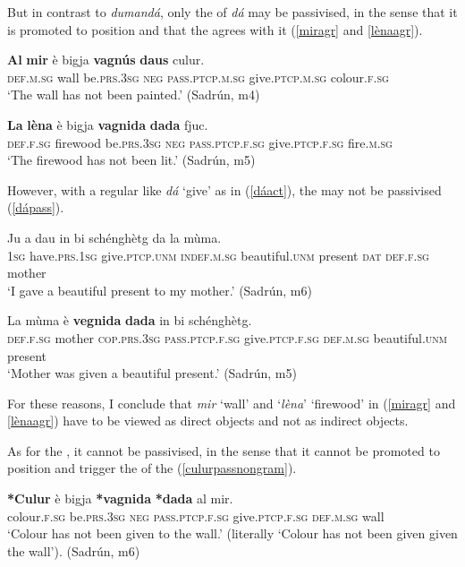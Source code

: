 But in contrast to \textit{dumandá}, only the  of \textit{dá} may be passivised, in the sense that it is promoted to  position and that the  agrees with it (\ref{miragr} and \ref{lènaagr}).

\ea
\label{miragr}
\gll  \textbf{Al} \textbf{mir} è bigja \textbf{vagnús} \textbf{daus} culur.\\
\textsc{def.m.sg} wall be.\textsc{prs.3sg} \textsc{neg} \textsc{pass.ptcp.m.sg} give\textsc{.ptcp.m.sg} colour.\textsc{f.sg}\\
\glt `The wall has not been painted.' (Sadrún, m4)
\z

\ea
\label{lènaagr}
\gll  \textbf{La} \textbf{lèna} è bigja \textbf{vagnida} \textbf{dada} fjuc.\\
\textsc{def.f.sg} firewood be.\textsc{prs.3sg} \textsc{neg} \textsc{pass.ptcp.f.sg} give.\textsc{ptcp.f.sg} fire.\textsc{m.sg}\\
\glt `The firewood has not been lit.' (Sadrún, m5)
\z


However, with a regular  like \textit{dá} `give' as in (\ref{dáact}), the  may not be passivised (\ref{dápass}).

\ea
\label{dáact}
 \gll Ju a dau in bi schénghètg da la mùma.\\
 \textsc{1sg} have\textsc{.prs.1sg} give\textsc{.ptcp.unm} \textsc{indef.m.sg} beautiful.\textsc{unm} present \textsc{dat} \textsc{def.f.sg} mother\\
\glt  `I gave a beautiful present to my mother.' (Sadrún, m6)
 \z

\ea
\label{dápass}
\gll *La mùma è \textbf{vegnida} \textbf{dada} in bi schénghètg.\\
\textsc{def.f.sg} mother \textsc{cop.prs.3sg} \textsc{pass.ptcp.f.sg} give.\textsc{ptcp.f.sg} \textsc{def.m.sg} beautiful.\textsc{unm} present\\
\glt `Mother was given a beautiful present.' (Sadrún, m5)
\z

For these reasons, I conclude that \textit{mir} `wall' and `\textit{lèna}' `firewood' in (\ref{miragr} and \ref{lènaagr}) have to be viewed as direct objects and not as indirect objects.


As for the , it cannot be passivised, in the sense that it cannot be promoted to  position and trigger the  of the  (\ref{culurpassnongram}).

\ea
\label{culurpassnongram}
\gll  \textbf{*Culur} è   bigja \textbf{*vagnida} \textbf{*dada} al mir.\\
colour.\textsc{f.sg} be.\textsc{prs.3sg} \textsc{neg} \textsc{pass.ptcp.f.sg} give.\textsc{ptcp.f.sg}  \textsc{def.m.sg} wall\\
\glt `Colour has not been given to the wall.' (literally `Colour has not been given given the wall'). (Sadrún, m6)
\z


